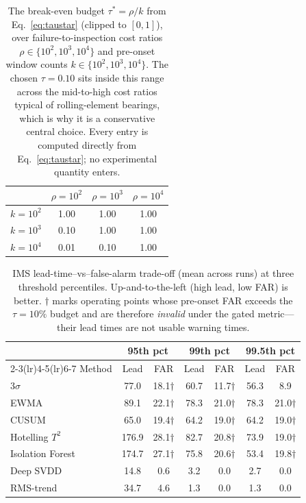\documentclass[journal]{IEEEtran}
\begin{document}
\begin{table}[t]
\caption{The break-even budget $\tau^{\ast}=\rho/k$ from Eq.~\eqref{eq:taustar}
(clipped to $[0,1]$), over failure-to-inspection cost ratios
$\rho\in\{10^2,10^3,10^4\}$ and pre-onset window counts $k\in\{10^2,10^3,10^4\}$.
The chosen $\tau{=}0.10$ sits inside this range across the mid-to-high cost ratios
typical of rolling-element bearings, which is why it is a conservative central
choice. Every entry is computed directly from Eq.~\eqref{eq:taustar}; no
experimental quantity enters.}
\label{tab:taustar_grid}
\centering
\footnotesize
\setlength{\tabcolsep}{8pt}
\begin{tabular}{@{}lccc@{}}
\toprule
 & $\rho{=}10^2$ & $\rho{=}10^3$ & $\rho{=}10^4$ \\
\midrule
$k{=}10^2$ & 1.00 & 1.00 & 1.00 \\
$k{=}10^3$ & 0.10 & 1.00 & 1.00 \\
$k{=}10^4$ & 0.01 & 0.10 & 1.00 \\
\bottomrule
\end{tabular}
\end{table}


\begin{table}[t]
\caption{IMS lead-time--vs--false-alarm trade-off (mean across runs) at three
threshold percentiles. Up-and-to-the-left (high lead, low FAR) is better.
$\dagger$ marks operating points whose pre-onset FAR exceeds the
$\tau{=}10\%$ budget and are therefore \emph{invalid} under the gated metric---
their lead times are not usable warning times.}
\label{tab:tradeoff}
\centering
\footnotesize
\begin{tabular}{@{}lcccccc@{}}
\toprule
& \multicolumn{2}{c}{95th pct} & \multicolumn{2}{c}{99th pct}
& \multicolumn{2}{c}{99.5th pct} \\
\cmidrule(lr){2-3}\cmidrule(lr){4-5}\cmidrule(lr){6-7}
Method & Lead & FAR & Lead & FAR & Lead & FAR \\
\midrule
3$\sigma$        & 77.0 & 18.1$\dagger$ & 60.7 & 11.7$\dagger$ & 56.3 & \phantom{0}8.9 \\
EWMA             & 89.1 & 22.1$\dagger$ & 78.3 & 21.0$\dagger$ & 78.3 & 21.0$\dagger$ \\
CUSUM            & 65.0 & 19.4$\dagger$ & 64.2 & 19.0$\dagger$ & 64.2 & 19.0$\dagger$ \\
Hotelling $T^2$  & 176.9& 28.1$\dagger$ & 82.7 & 20.8$\dagger$ & 73.9 & 19.0$\dagger$ \\
Isolation Forest & 174.7& 27.1$\dagger$ & 75.8 & 20.6$\dagger$ & 53.4 & 19.8$\dagger$ \\
Deep SVDD        & 14.8 & \phantom{0}0.6 & \phantom{0}3.2 & 0.0 & \phantom{0}2.7 & 0.0 \\
RMS-trend        & 34.7 & \phantom{0}4.6 & \phantom{0}1.3 & 0.0 & 1.3 & 0.0 \\
\bottomrule
\end{tabular}
\end{table}
\end{document}
